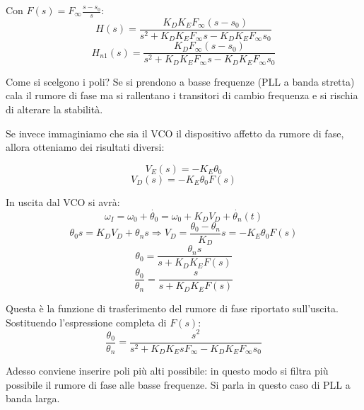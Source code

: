 Con $F(s) = F_{\infty}\frac{s-s_0}{s}$:
\[H(s) = \frac{K_D K_E F_{\infty} (s-s_0)}{s^2 + K_D K_E F_{\infty} s - K_D K_E F_{\infty} s_0} \]
\[H_{n1}(s) = \frac{K_D F_{\infty} (s-s_0)}{s^2 + K_D K_E F_{\infty} s - K_D K_E F_{\infty} s_0}  \]

Come si scelgono i poli? Se si prendono a basse frequenze (PLL a banda stretta) cala il rumore di fase ma si rallentano i transitori di cambio frequenza e si rischia di alterare la stabilità.

Se invece immaginiamo che sia il VCO il dispositivo affetto da rumore di fase, allora otteniamo dei risultati diversi:

\[V_E(s) = -K_E \theta_{0} \]
\[V_D(s) = -K_E \theta_{0}F(s)\]

In uscita dal VCO si avrà:
\[\omega_I =\omega_0 + \dot{\theta_0} = \omega_0 + K_D V_D + \dot{\theta_n} (t)  \]
\[ \theta_{0}s = K_D V_D + \theta_n s \Rightarrow V_D = \frac{\theta_{0}-\theta_n}{K_D} s = -K_E \theta_{0}F(s)\]
\[\theta_0 = \frac{\theta_n s}{s + K_D K_E F(s)}\]
\[\frac{\theta_0}{\theta_n} = \frac{s}{s + K_D K_E F(s)}\]

Questa è la funzione di trasferimento del rumore di fase riportato sull'uscita. Sostituendo l'espressione completa di $F(s)$:
\[\frac{\theta_0}{\theta_n} = \frac{s^2}{s^2 + K_D K_E s F_{\infty} -K_D K_E F_{\infty} s_0} \]

Adesso conviene inserire poli più alti possibile: in questo modo si filtra più possibile il rumore di fase alle basse frequenze. Si parla in questo caso di PLL a banda larga.